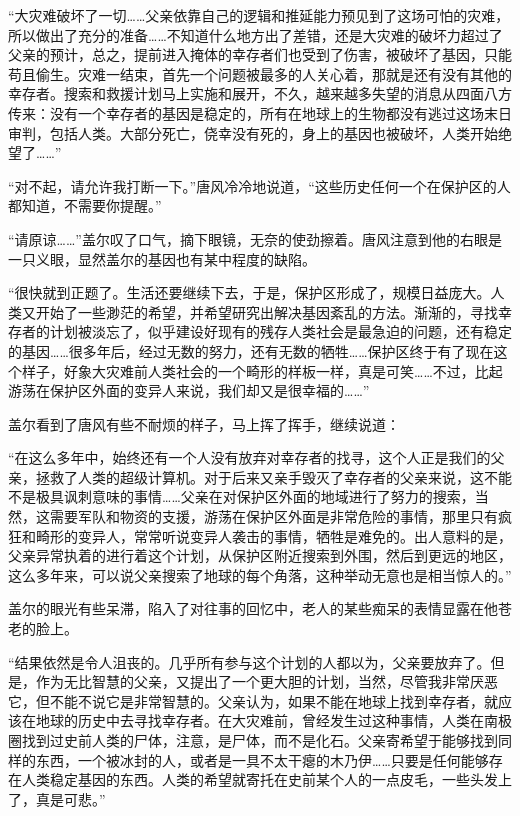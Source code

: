 “大灾难破坏了一切……父亲依靠自己的逻辑和推延能力预见到了这场可怕的灾难，所以做出了充分的准备……不知道什么地方出了差错，还是大灾难的破坏力超过了父亲的预计，总之，提前进入掩体的幸存者们也受到了伤害，被破坏了基因，只能苟且偷生。灾难一结束，首先一个问题被最多的人关心着，那就是还有没有其他的幸存者。搜索和救援计划马上实施和展开，不久，越来越多失望的消息从四面八方传来：没有一个幸存者的基因是稳定的，所有在地球上的生物都没有逃过这场末日审判，包括人类。大部分死亡，侥幸没有死的，身上的基因也被破坏，人类开始绝望了……”

“对不起，请允许我打断一下。”唐风冷冷地说道，“这些历史任何一个在保护区的人都知道，不需要你提醒。”

“请原谅……”盖尔叹了口气，摘下眼镜，无奈的使劲擦着。唐风注意到他的右眼是一只义眼，显然盖尔的基因也有某中程度的缺陷。

“很快就到正题了。生活还要继续下去，于是，保护区形成了，规模日益庞大。人类又开始了一些渺茫的希望，并希望研究出解决基因紊乱的方法。渐渐的，寻找幸存者的计划被淡忘了，似乎建设好现有的残存人类社会是最急迫的问题，还有稳定的基因……很多年后，经过无数的努力，还有无数的牺牲……保护区终于有了现在这个样子，好象大灾难前人类社会的一个畸形的样板一样，真是可笑……不过，比起游荡在保护区外面的变异人来说，我们却又是很幸福的……”

盖尔看到了唐风有些不耐烦的样子，马上挥了挥手，继续说道：

“在这么多年中，始终还有一个人没有放弃对幸存者的找寻，这个人正是我们的父亲，拯救了人类的超级计算机。对于后来又亲手毁灭了幸存者的父亲来说，这不能不是极具讽刺意味的事情……父亲在对保护区外面的地域进行了努力的搜索，当然，这需要军队和物资的支援，游荡在保护区外面是非常危险的事情，那里只有疯狂和畸形的变异人，常常听说变异人袭击的事情，牺牲是难免的。出人意料的是，父亲异常执着的进行着这个计划，从保护区附近搜索到外围，然后到更远的地区，这么多年来，可以说父亲搜索了地球的每个角落，这种举动无意也是相当惊人的。”

盖尔的眼光有些呆滞，陷入了对往事的回忆中，老人的某些痴呆的表情显露在他苍老的脸上。

“结果依然是令人沮丧的。几乎所有参与这个计划的人都以为，父亲要放弃了。但是，作为无比智慧的父亲，又提出了一个更大胆的计划，当然，尽管我非常厌恶它，但不能不说它是非常智慧的。父亲认为，如果不能在地球上找到幸存者，就应该在地球的历史中去寻找幸存者。在大灾难前，曾经发生过这种事情，人类在南极圈找到过史前人类的尸体，注意，是尸体，而不是化石。父亲寄希望于能够找到同样的东西，一个被冰封的人，或者是一具不太干瘪的木乃伊……只要是任何能够存在人类稳定基因的东西。人类的希望就寄托在史前某个人的一点皮毛，一些头发上了，真是可悲。”

